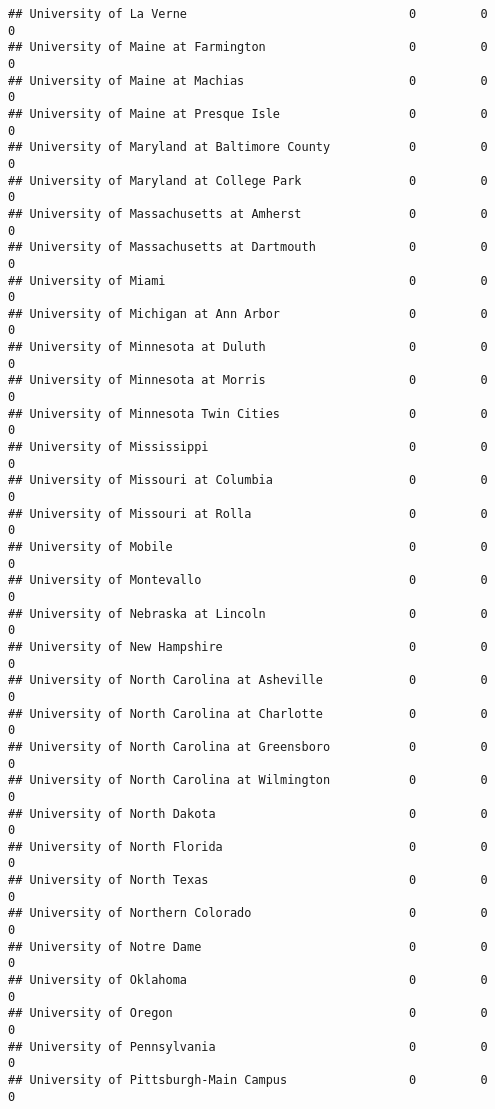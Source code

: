 \documentclass[
]{article}
\begin{document}
\begin{verbatim}
## University of La Verne                               0         0           0
## University of Maine at Farmington                    0         0           0
## University of Maine at Machias                       0         0           0
## University of Maine at Presque Isle                  0         0           0
## University of Maryland at Baltimore County           0         0           0
## University of Maryland at College Park               0         0           0
## University of Massachusetts at Amherst               0         0           0
## University of Massachusetts at Dartmouth             0         0           0
## University of Miami                                  0         0           0
## University of Michigan at Ann Arbor                  0         0           0
## University of Minnesota at Duluth                    0         0           0
## University of Minnesota at Morris                    0         0           0
## University of Minnesota Twin Cities                  0         0           0
## University of Mississippi                            0         0           0
## University of Missouri at Columbia                   0         0           0
## University of Missouri at Rolla                      0         0           0
## University of Mobile                                 0         0           0
## University of Montevallo                             0         0           0
## University of Nebraska at Lincoln                    0         0           0
## University of New Hampshire                          0         0           0
## University of North Carolina at Asheville            0         0           0
## University of North Carolina at Charlotte            0         0           0
## University of North Carolina at Greensboro           0         0           0
## University of North Carolina at Wilmington           0         0           0
## University of North Dakota                           0         0           0
## University of North Florida                          0         0           0
## University of North Texas                            0         0           0
## University of Northern Colorado                      0         0           0
## University of Notre Dame                             0         0           0
## University of Oklahoma                               0         0           0
## University of Oregon                                 0         0           0
## University of Pennsylvania                           0         0           0
## University of Pittsburgh-Main Campus                 0         0           0

\end{verbatim}
\end{document}

